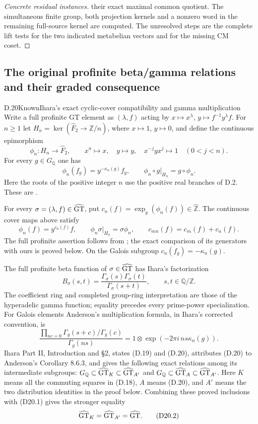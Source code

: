 \begin{proof}[Concrete residual instances]
their exact maximal common quotient. The simultaneous finite group, both projection kernels and a nonzero word in the remaining full-source kernel are computed. The unresolved steps are the complete lift tests for the two indicated metabelian vectors and for the missing CM coset.
\end{proof}

\subsection{The original profinite beta/gamma relations and their graded consequence}

\begin{statement}{D.20}{Known}{Ihara's exact cyclic-cover compatibility and gamma multiplication}
Write a full profinite GT element as $(\lambda,f)$ acting by
$x\mapsto x^\lambda$, $y\mapsto f^{-1}y^\lambda f$.
For $n\geq1$ let $H_n=\ker(\widehat F_2\to\mathbb Z/n)$, where $x\mapsto1$, $y\mapsto0$, and define the continuous epimorphism
\[
 \phi_n:H_n\longrightarrow\widehat F_2,\qquad
 x^n\mapsto x,\quad y\mapsto y,\quad x^{-j}yx^j\mapsto1\quad(0<j<n).
\]
For every $g\in G_{\mathbb Q}$ one has
\[
 \phi_n(f_g)=y^{-\kappa_n(g)}f_g,\qquad
 \phi_n\circ g|_{H_n}=g\circ\phi_n .                         \tag{D.18}
\]
Here the roots of the positive integer $n$ use the positive real branches of D.2. These are \cite[Theorem 1 and Proposition 1]{dIhara2000}.

For every $\sigma=(\lambda,f)\in\widehat{\rm GT}$, put
$c_n(f)=\operatorname{exp}_y(\phi_n(f))\in\widehat{\mathbb Z}$.
The continuous cover maps above satisfy
\[
 \phi_n(f)=y^{c_n(f)}f,\qquad
 \phi_n\sigma|_{H_n}=\sigma\phi_n,\qquad
 c_{mn}(f)=c_m(f)+c_n(f).
 \tag{D20.1}
\]
The full profinite assertion follows from
\cite[Theorem8.1 and Remark8.6]{dEnriquez2007}; the exact
comparison of its generators with ours is proved below.
On the Galois subgroup $c_n(f_g)=-\kappa_n(g)$.

The full profinite beta function of $\sigma\in\widehat{\rm GT}$ has Ihara's factorization
\[
 B_\sigma(s,t)=\frac{\Gamma_\sigma(s)\Gamma_\sigma(t)}{\Gamma_\sigma(s+t)},
 \qquad s,t\in\mathbb Q/\mathbb Z.                          \tag{D.19}
\]
The coefficient ring and completed group-ring interpretation are those of the hyperadelic gamma function; equality precedes every prime-power specialization. For Galois elements Anderson's multiplication formula, in Ihara's corrected convention, is
\[
 \frac{\prod_{nc=0}\Gamma_g(s+c)/\Gamma_g(c)}{\Gamma_g(ns)}
       =1\otimes\exp(-2\pi i\,ns\kappa_n(g)).                 \tag{D.20}
\]
Ihara Part II, Introduction and \S2, states (D.19) and (D.20), attributes (D.20) to Anderson's Corollary 8.6.3, and gives the following exact relations among its intermediate subgroups:
$G_{\mathbb Q}\subset\widehat{\rm GT}_K\subset\widehat{\rm GT}_{A'}$ and
$G_{\mathbb Q}\subset\widehat{\rm GT}_A\subset\widehat{\rm GT}_{A'}$.
Here $K$ means all the commuting squares in (D.18), $A$ means (D.20), and $A'$ means the two distribution identities in the proof below.
Combining these proved inclusions with (D20.1) gives the
stronger equality
\[
 \widehat{\rm GT}_K=\widehat{\rm GT}_{A'}
                   =\widehat{\rm GT}.
 \tag{D20.2}
\]
\end{statement}
